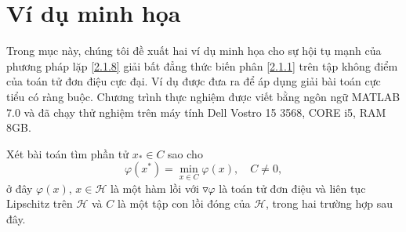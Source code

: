 \documentclass[14pt, oneside,A4paper]{book}
\theoremstyle{plain}
\begin{document}
\section{Ví dụ minh họa}

Trong mục này, chúng tôi đề xuất hai ví dụ minh họa cho sự hội tụ mạnh của phương pháp lặp \eqref{2.1.8} giải bất đẳng thức biến phân \eqref{2.1.1} trên tập không điểm của toán tử đơn điệu cực đại. Ví dụ được đưa ra để áp dụng giải bài toán cực tiểu có ràng buộc. Chương trình thực nghiệm được viết bằng ngôn ngữ MATLAB 7.0 và đã chạy thử nghiệm trên máy tính Dell Vostro 15 3568, CORE i5, RAM 8GB.

Xét bài toán tìm phần tử $x_{*} \in C$ sao cho
\begin{equation}\label{vds}
\varphi (x^*)=\min_{x \in C} \varphi(x), \quad C \neq  0,
\end{equation}
ở đây $\varphi (x)$, $x \in \mathcal H$ là một hàm lồi với $\triangledown \varphi$ là toán tử đơn điệu và liên tục Lipschitz trên $\mathcal H$ và $C$ là một tập con lồi đóng của $\mathcal H$, trong hai trường hợp sau đây.
\end{document}
